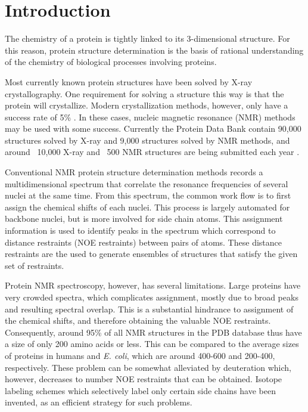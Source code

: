 \chapter{Introduction}

The chemistry of a protein is tightly linked to its 3-dimensional structure.
For this reason, protein structure determination is the basis of rational understanding of the chemistry of biological processes involving proteins.

Most currently known protein structures have been solved by X-ray crystallography.
One requirement for solving a structure this way is that the protein will crystallize.
Modern crystallization methods, however, only have a success rate of 5\% \cite{xray}.
In these cases, nucleic magnetic resonance (NMR) methods may be used with some success.
Currently the Protein Data Bank contain 90,000 structures solved by X-ray and 9,000 structures solved by NMR methods, and around ~10,000 X-ray and ~500 NMR structures are being submitted each year \cite{PDB}.

Conventional NMR protein structure determination methods records a multidimensional spectrum that correlate the resonance frequencies of several nuclei at the same time.
From this spectrum, the common work flow is to first assign the chemical shifts of each nuclei.
This process is largely automated for backbone nuclei, but is more involved for side chain atoms.
This assignment information is used to identify peaks in the spectrum which correspond to distance restraints (NOE restraints) between pairs of atoms.
These distance restraints are the used to generate ensembles of structures that satisfy the given set of restraints.

Protein NMR spectroscopy, however, has several limitations.
Large proteins have very crowded spectra, which complicates assignment, mostly due to broad peaks and resulting spectral overlap.
This is a substantial hindrance to assignment of the chemical shifts, and therefore obtaining the valuable NOE restraints.
Consequently, around 95\% of all NMR structures in the PDB database thus have a size of only 200 amino acids or less.
This can be compared to the average sizes of proteins in humans and \textit{E. coli}, which are around 400-600 and 200-400, respectively.
These problem can be somewhat alleviated by deuteration which, however, decreases to number NOE restraints that can be obtained.
Isotope labeling schemes which selectively label only certain side chains have been invented, as an efficient strategy for such problems.

